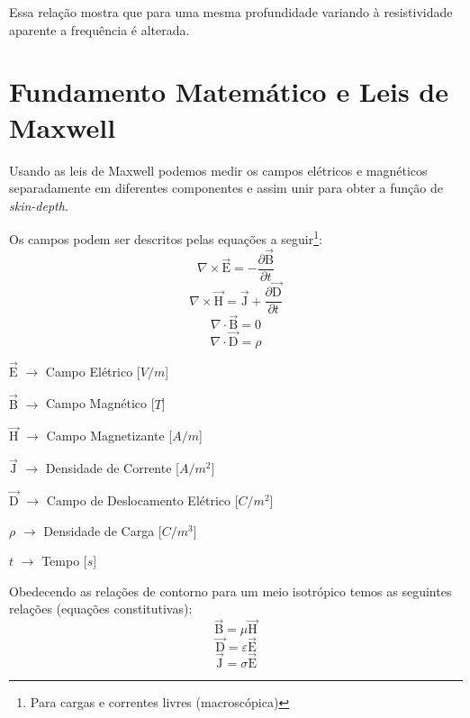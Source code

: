 	Essa relação mostra que para uma mesma profundidade variando à resistividade
	aparente a frequência é alterada.


    \section{Fundamento Matemático e Leis de Maxwell}
	\label{mat_maxwell}

	Usando as leis de Maxwell \cite{eletromag8hayt} podemos medir os campos elétricos
	e magnéticos separadamente em diferentes componentes e assim unir para obter a 
	função de \textit{skin-depth}.
	
	Os campos podem ser descritos pelas equações a seguir\footnote{Para cargas e correntes livres
	(macroscópica)}:
	    \begin{equation}
		\label{rot_elet_max}
		\nabla \times \vec{\textrm{E}}=-\frac{\partial \vec{\textrm{B}}}{\partial t} 
	    \end{equation}
	    \begin{equation}
		\label{rot_mag_max}
 		\nabla \times \vec{\textrm{H}} = \vec{\textrm{J}} + \frac{\partial \vec{\textrm{D}}}{\partial t}
	    \end{equation}
	    \begin{equation}
 		\nabla \cdot \vec{\textrm{B}} = 0
	    \end{equation}
	    \begin{equation}
 		\nabla \cdot \vec{\textrm{D}} = \rho
	    \end{equation}

	    $\vec{\textrm{E}}$ $\rightarrow$ Campo Elétrico [$V/m$]
	    
	    $\vec{\textrm{B}}$ $\rightarrow$ Campo Magnético [$T$]
	    
	    $\vec{\textrm{H}}$ $\rightarrow$ Campo Magnetizante [$A/m$]
	    
	    $\vec{\textrm{J}}$ $\rightarrow$ Densidade de Corrente [$A/m^2$]
	    
	    $\vec{\textrm{D}}$ $\rightarrow$ Campo de Deslocamento Elétrico [$C/m^2$]
	    
	    $\rho$ $\rightarrow$ Densidade de Carga [$C/m^3$]
	    
	    $t$ $\rightarrow$ Tempo [$s$]

	    Obedecendo as relações de contorno para um meio isotrópico temos as seguintes
	    relações (equações constitutivas):
	    \begin{equation}
	      \label{con_B}
	      \vec{\textrm{B}} = \mu \vec{\textrm{H}}
	    \end{equation}
	    \begin{equation}
	      \label{con_D}
	      \vec{\textrm{D}} = \varepsilon  \vec{\textrm{E}}
	    \end{equation}
	    \begin{equation}
	      \label{con_J}
	      \vec{\textrm{J}} = \sigma \vec{\textrm{E}}
	    \end{equation}
	    
